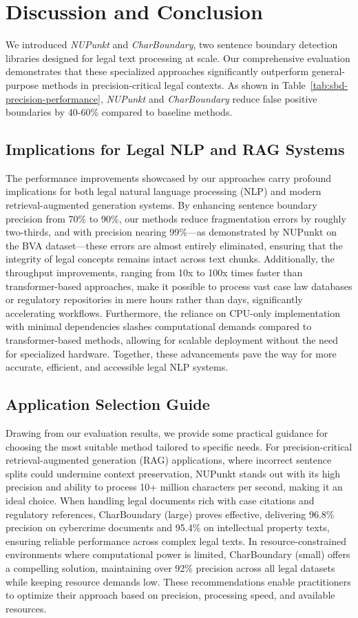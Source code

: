 \section{Discussion and Conclusion}
We introduced \textit{NUPunkt} and \textit{CharBoundary}, two sentence boundary detection libraries designed for legal text processing at scale. Our comprehensive evaluation demonstrates that these specialized approaches significantly outperform general-purpose methods in precision-critical legal contexts. As shown in Table~\ref{tab:sbd-precision-performance}, \textit{NUPunkt} and \textit{CharBoundary} reduce false positive boundaries by 40-60\% compared to baseline methods.

\subsection{Implications for Legal NLP and RAG Systems}
The performance improvements showcased by our approaches carry profound implications for both legal natural language processing (NLP) and modern retrieval-augmented generation systems.   By enhancing sentence boundary precision from 70\% to 90\%, our methods reduce fragmentation errors by roughly two-thirds, and with precision nearing 99\%—as demonstrated by NUPunkt on the BVA dataset—these errors are almost entirely eliminated, ensuring that the integrity of legal concepts remains intact across text chunks. Additionally, the throughput improvements, ranging from 10x to 100x times faster than transformer-based approaches, make it possible to process vast case law databases or regulatory repositories in mere hours rather than days, significantly accelerating workflows. Furthermore, the reliance on CPU-only implementation with minimal dependencies slashes computational demands compared to transformer-based methods, allowing for scalable deployment without the need for specialized hardware. Together, these advancements pave the way for more accurate, efficient, and accessible legal NLP systems.

\subsection{Application Selection Guide}
Drawing from our evaluation results, we provide some practical guidance for choosing the most suitable method tailored to specific needs.  For precision-critical retrieval-augmented generation (RAG) applications, where incorrect sentence splits could undermine context preservation, NUPunkt stands out with its high precision and ability to process 10+ million characters per second, making it an ideal choice.  When handling legal documents rich with case citations and regulatory references, CharBoundary (large) proves effective, delivering 96.8\% precision on cybercrime documents and 95.4\% on intellectual property texts, ensuring reliable performance across complex legal texts.  In resource-constrained environments where computational power is limited, CharBoundary (small) offers a compelling solution, maintaining over 92\% precision across all legal datasets while keeping resource demands low.  These recommendations enable practitioners to optimize their approach based on precision, processing speed, and available resources.

